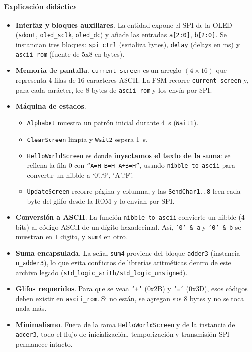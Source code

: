 \documentclass[a4paper,12pt]{article}
\begin{document}
\paragraph{Explicación didáctica}
\begin{itemize}
  \item \textbf{Interfaz y bloques auxiliares}. La entidad expone el SPI de la OLED (\texttt{sdout}, \texttt{oled\_sclk}, \texttt{oled\_dc}) y añade las entradas \texttt{a[2:0]}, \texttt{b[2:0]}. Se instancian tres bloques: \texttt{spi\_ctrl} (serializa bytes), \texttt{delay} (delays en ms) y \texttt{ascii\_rom} (fuente de 5x8 en bytes).
  \item \textbf{Memoria de pantalla}. \texttt{current\_screen} es un arreglo \((4\times16)\) que representa 4 filas de 16 caracteres ASCII. La FSM recorre \texttt{current\_screen} y, para cada carácter, lee 8 bytes de \texttt{ascii\_rom} y los envía por SPI.
  \item \textbf{Máquina de estados}. 
  \begin{itemize}
    \item \texttt{Alphabet} muestra un patrón inicial durante 4~s (\texttt{Wait1}).
    \item \texttt{ClearScreen} limpia y \texttt{Wait2} espera 1~s.
    \item \texttt{HelloWorldScreen} es donde \textbf{inyectamos el texto de la suma}: se rellena la fila 0 con \texttt{``A=H B=H A+B=H''}, usando \texttt{nibble\_to\_ascii} para convertir un nibble a ‘0’..‘9’, ‘A’..‘F’.
    \item \texttt{UpdateScreen} recorre página y columna, y las \texttt{SendChar1..8} leen cada byte del glifo desde la ROM y lo envían por SPI.
  \end{itemize}
  \item \textbf{Conversión a ASCII}. La función \texttt{nibble\_to\_ascii} convierte un nibble (4 bits) al código ASCII de un dígito hexadecimal. Así, \texttt{'0' \& a} y \texttt{'0' \& b} se muestran en 1 dígito, y \texttt{sum4} en otro.
  \item \textbf{Suma encapsulada}. La señal \texttt{sum4} proviene del bloque \texttt{adder3} (instancia \texttt{u\_adder3}), lo que evita conflictos de librerías aritméticas dentro de este archivo legado (\texttt{std\_logic\_arith/std\_logic\_unsigned}).
  \item \textbf{Glifos requeridos}. Para que se vean \texttt{‘+’} (0x2B) y \texttt{‘=’} (0x3D), esos códigos deben existir en \texttt{ascii\_rom}. Si no están, se agregan sus 8 bytes y no se toca nada más.
  \item \textbf{Minimalismo}. Fuera de la rama \texttt{HelloWorldScreen} y de la instancia de \texttt{adder3}, todo el flujo de inicialización, temporización y transmisión SPI permanece intacto.
\end{itemize}
\end{document}
